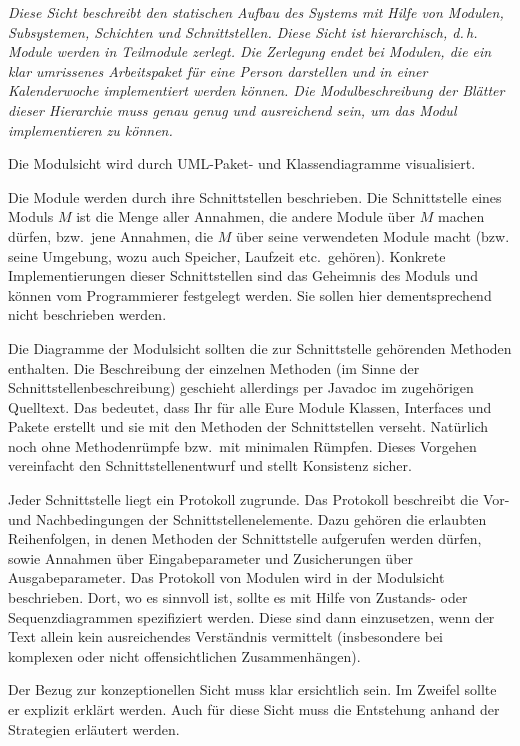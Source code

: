 \documentclass[fontsize=12pt,paper=a4,twoside]{scrartcl}
\begin{document}
{\itshape Diese Sicht beschreibt den statischen Aufbau des Systems mit Hilfe von
Modulen, Subsystemen, Schichten und Schnittstellen. Diese Sicht ist 
hierarchisch, d.\,h. Module werden in Teilmodule zerlegt. Die Zerlegung endet 
bei Modulen, die ein klar umrissenes Arbeitspaket für eine Person darstellen und
in einer Kalenderwoche implementiert werden können. Die Modulbeschreibung der 
Blätter dieser Hierarchie muss genau genug und ausreichend sein, um das Modul 
implementieren zu können.

Die Modulsicht wird durch {UML}-Paket- und Klassendiagramme visualisiert.

Die Module werden durch ihre Schnittstellen beschrieben.
Die Schnittstelle eines Moduls $M$ ist die Menge aller Annahmen, die andere 
Module über $M$ machen dürfen, bzw.\ jene Annahmen, die $M$ über seine 
verwendeten Module macht (bzw. seine Umgebung, wozu auch Speicher, Laufzeit 
etc.\ gehören).
Konkrete Implementierungen dieser Schnittstellen sind das Geheimnis des Moduls
und können vom Programmierer festgelegt werden. Sie sollen hier dementsprechend 
nicht beschrieben werden. 

Die Diagramme der Modulsicht sollten die zur Schnittstelle gehörenden Methoden
enthalten. Die Beschreibung der einzelnen Methoden (im Sinne der 
Schnittstellenbeschreibung) geschieht allerdings per Javadoc im zugehörigen 
Quelltext. Das bedeutet, dass Ihr für alle Eure Module Klassen, Interfaces und 
Pakete erstellt und sie mit den Methoden der Schnittstellen verseht. Natürlich 
noch ohne Methodenrümpfe bzw.\ mit minimalen Rümpfen. Dieses Vorgehen 
vereinfacht den Schnittstellenentwurf und stellt Konsistenz sicher.

Jeder Schnittstelle liegt ein Protokoll zugrunde. Das Protokoll beschreibt die 
Vor- und Nachbedingungen der Schnittstellenelemente. Dazu gehören die erlaubten
Reihenfolgen, in denen Methoden der Schnittstelle aufgerufen werden dürfen, 
sowie Annahmen über Eingabeparameter und Zusicherungen über Ausgabeparameter. 
Das Protokoll von Modulen wird in der Modulsicht beschrieben.
Dort, wo es sinnvoll ist, sollte es mit Hilfe von Zustands- oder 
Sequenzdiagrammen spezifiziert werden. Diese sind dann einzusetzen, wenn der
Text allein kein ausreichendes Verständnis vermittelt (insbesondere bei 
komplexen oder nicht offensichtlichen Zusammenhängen).

Der Bezug zur konzeptionellen Sicht muss klar ersichtlich sein. Im Zweifel 
sollte er explizit erklärt werden. Auch für diese Sicht muss die Entstehung 
anhand der Strategien erläutert werden.}
\end{document}
